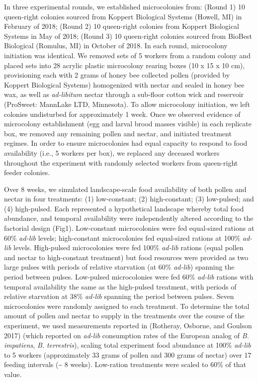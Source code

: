 \documentclass[11pt,]{article}
\begin{document}
In three experimental rounds, we established microcolonies from: (Round
1) 10 queen-right colonies sourced from Koppert Biological Systems
(Howell, MI) in February of 2018; (Round 2) 10 queen-right colonies from
Koppert Biological Systems in May of 2018; (Round 3) 10 queen-right
colonies sourced from BioBest Biological (Romulus, MI) in October of
2018. In each round, microcolony initiation was identical. We removed
sets of 5 workers from a random colony and placed sets into 28 acrylic
plastic microcolony rearing boxes (10 x 15 x 10 cm), provisioning each
with 2 grams of honey bee collected pollen (provided by Koppert
Biological Systems) homogenized with nectar and sealed in honey bee wax,
as well as \emph{ad-libitum} nectar through a sub-floor cotton wick and
reservoir (ProSweet: MannLake LTD, Minnesota). To allow microcolony
initiation, we left colonies undisturbed for approximately 1 week. Once
we observed evidence of microcolony establishment (egg and larval brood
masses visible) in each replicate box, we removed any remaining pollen
and nectar, and initiated treatment regimes. In order to ensure
microcolonies had equal capacity to respond to food availability (i.e.,
5 workers per box), we replaced any deceased workers throughout the
experiment with randomly selected workers from queen-right feeder
colonies.

Over 8 weeks, we simulated landscape-scale food availability of both
pollen and nectar in four treatments: (1) low-constant; (2)
high-constant; (3) low-pulsed; and (4) high-pulsed. Each represented a
hypothetical landscape whereby total food abundance, and temporal
availability were independently altered according to the factorial
design (Fig1). Low-constant microcolonies were fed equal-sized rations
at 60\% \emph{ad-lib} levels; high-constant microcolonies fed
equal-sized rations at 100\% \emph{ad-lib} levels. High-pulsed
microcolonies were fed 100\% \emph{ad-lib} rations (equal pollen and
nectar to high-constant treatment) but food resources were provided as
two large pulses with periods of relative starvation (at 60\%
\emph{ad-lib}) spanning the period between pulses. Low-pulsed
microcolonies were fed 60\% \emph{ad-lib} rations with temporal
availability the same as the high-pulsed treatment, with periods of
relative starvation at 38\% \emph{ad-lib} spanning the period between
pulses. Seven microcolonies were randomly assigned to each treatment. To
determine the total amount of pollen and nectar to supply in the
treatments over the course of the experiment, we used measurements
reported in (Rotheray, Osborne, and Goulson 2017) (which reported on
\emph{ad-lib} consumption rates of the European analog of \emph{B.
impatiens}, \emph{B. terrestris}), scaling total experiment food
abundance at 100\% \emph{ad-lib} to 5 workers (approximately 33 grams of
pollen and 300 grams of nectar) over 17 feeding intervals
(\textasciitilde{} 8 weeks). Low-ration treatments were scaled to 60\%
of that value.
\end{document}
